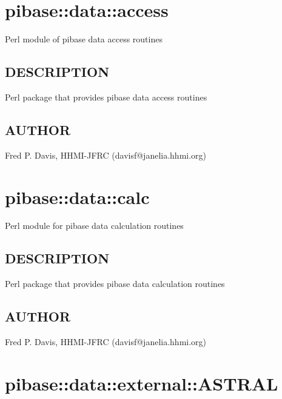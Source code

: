 \documentclass{article}
\begin{document}
\section{pibase::data::access\label{pibase::data::access}}


Perl module of pibase data access routines

\subsection*{DESCRIPTION\label{pibase::data::access_DESCRIPTION}}


Perl package that provides pibase data access routines

\subsection*{AUTHOR\label{pibase::data::access_AUTHOR}}


Fred P. Davis, HHMI-JFRC (davisf@janelia.hhmi.org)

\clearpage
\section{pibase::data::calc\label{pibase::data::calc}}


Perl module for pibase data calculation routines

\subsection*{DESCRIPTION\label{pibase::data::calc_DESCRIPTION}}


Perl package that provides pibase data calculation routines

\subsection*{AUTHOR\label{pibase::data::calc_AUTHOR}}


Fred P. Davis, HHMI-JFRC (davisf@janelia.hhmi.org)

\clearpage
\section{pibase::data::external::ASTRAL\label{pibase::data::external::ASTRAL}}
\end{document}
